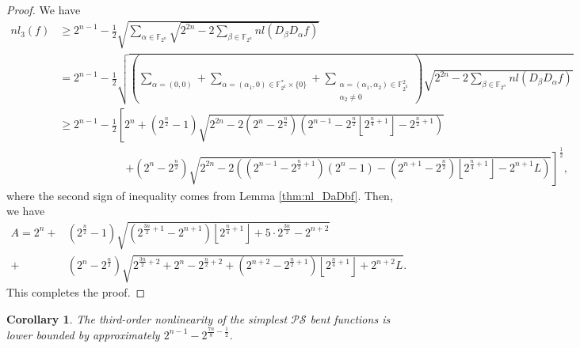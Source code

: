 \documentclass{article}
\newcommand{\F}{\mathbb{F}}
\newcommand{\0}{\textbf{0}}
\newcommand{\1}{\textbf{1}}
\theoremstyle{plain}
\newtheorem{remark}{Remark}
\newtheorem{corollary}{Corollary}
\begin{document}
    \begin{proof}
        We have 
        \begin{align*}
            nl_3(f)&\ge 2^{n-1}-\frac{1}{2}\sqrt{\sum_{\alpha\in\F_{2^n}}\sqrt{2^{2n}-2\sum_{\beta\in\F_{2^n}} nl(D_{\beta}D_{\alpha}f)}}\\
            &=2^{n-1}-\frac{1}{2}\sqrt{\left( \sum_{\alpha=(0,0)}+\sum_{\alpha=(\alpha_1,0)\in\F_{2^k}^*\times\{0\}}+\sum_{\substack{\alpha=(\alpha_1,\alpha_2)\in\F_{2^k}^2\\\alpha_2\ne 0}} \right)\sqrt{2^{2n}-2\sum_{\beta\in\F_{2^n}} nl(D_{\beta}D_{\alpha}f)}}\\
            &\ge 2^{n-1}-\frac{1}{2}\left[2^n+(2^{\frac{n}{2}}-1)\sqrt{2^{2n}-2(2^n-2^{\frac{n}{2}})(2^{n-1}-2^{\frac{n}{2}}\left\lfloor 2^{\frac{n}{4}+1}\right\rfloor-2^{\frac{n}{2}+1})}\right.\\
            &\qquad\qquad\qquad\left.+(2^n-2^{\frac{n}{2}})\sqrt{2^{2n}-2\left( (2^{n-1}-2^{\frac{n}{2}+1})(2^n-1)-(2^{n+1}-2^{\frac{n}{2}})\left\lfloor 2^{\frac{n}{4}+1}\right\rfloor-2^{n+1}L \right)}\right]^{\frac{1}{2}},
        \end{align*}
        where the second sign of inequality comes from Lemma \ref{thm:nl_DaDbf}. 
        Then, we have 
        \begin{align*}
            A=2^n+&(2^{\frac{n}{2}}-1)\sqrt{(2^{\frac{3n}{2}+1}-2^{n+1})\left\lfloor 2^{\frac{n}{4}+1}\right\rfloor+5\cdot 2^{\frac{3n}{2}}-2^{n+2}}\\
            +&(2^n-2^{\frac{n}{2}})\sqrt{2^{\frac{3n}{2}+2}+2^n-2^{\frac{n}{2}+2}+(2^{n+2}-2^{\frac{n}{2}+1})\left\lfloor 2^{\frac{n}{4}+1}\right\rfloor+2^{n+2}L}.
        \end{align*}
        This completes the proof. 
    \end{proof}
    \begin{corollary}
        The third-order nonlinearity of the simplest $ \mathcal{PS} $ bent functions is lower bounded by approximately $ 2^{n-1}-2^{\frac{7n}{8}-\frac{1}{2}} $.
    \end{corollary}
\end{document}
